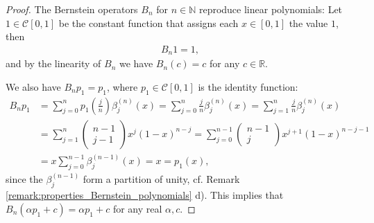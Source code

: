 \begin{proof}
	The Bernstein operators $B_n$ for $n\in\mathbb N$ reproduce linear polynomials: Let \\ $1\in\mathcal C[0, 1]$ be the constant function that assigns each $x\in[0, 1]$ the value $1$, then
	\begin{align}
		B_n 1 = 1, 
	\end{align}
	and by the linearity of $B_n$ we have $B_n(c) = c$ for any $c\in\mathbb R$.
	
	We also have $B_n p_1 = p_1$, where $p_1\in\mathcal C[0, 1]$ is the identity function:
	\begin{align}
		B_n p_1 &= \sum_{j=0}^{n}p_1\left(\frac{j}{n}\right)\beta_{j}^{(n)}(x) = \sum_{j=0}^{n}\frac{j}{n}\beta_j^{(n)}(x) = \sum_{j=1}^{n}\frac{j}{n}\beta_{j}^{(n)}(x)
		\\[4pt] &= \sum_{j=1}^{n}\begin{pmatrix}n-1 \\ j-1\end{pmatrix}x^j(1-x)^{n-j} = \sum_{j=0}^{n-1}\begin{pmatrix} n - 1 \\ j \end{pmatrix}x^{j+1}(1-x)^{n-j-1} 
		\\[4pt] &= x\sum_{j=0}^{n-1}\beta_{j}^{(n-1)}(x) = x = p_1(x),
	\end{align}
	since the $\beta_j^{(n-1)}$ form a partition of unity, cf. Remark \ref{remark:properties_Bernstein_polynomials} d). This implies that \\ $B_n(\alpha p_1 + c) = \alpha p_1 + c$ for any real $\alpha, c$.
	

\end{proof}
